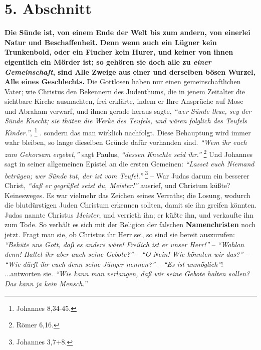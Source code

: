 \section{5. Abschnitt} \label{kap1_ab5}

\textbf{Die Sünde
ist, von einem Ende der Welt bis zum andern, von einerlei Natur und
Beschaffenheit. Denn wenn auch ein Lügner kein Trunkenbold, oder ein Flucher
kein Hurer, und keiner von ihnen eigentlich ein Mörder ist; so gehören sie doch
alle zu \textit{einer Gemeinschaft}, sind Alle Zweige aus einer und derselben
bösen Wurzel, Alle eines Geschlechts.} Die Gottlosen haben nur einen
gemeinschaftlichen Vater; wie Christus den Bekennern des Judenthums, die in
jenem Zeitalter die sichtbare Kirche ausmachten, frei erklärte, indem er Ihre
Ansprüche auf Mose und Abraham  
verwarf, und ihnen gerade heraus sagte,
\textit{"`wer Sünde thue, sey der Sünde Knecht; sie thäten die Werke des Teufels,
und wären folglich des Teufels Kinder."'},
\footnote{Johannes 8,34-45.}
.
sondern das man wirklich nachfolgt. Diese Behauptung wird immer wahr bleiben,
so lange dieselben Gründe dafür vorhanden sind.
\textit{"`Wem ihr euch zum Gehorsam ergebet,"'} sagt Paulus, \textit{"`dessen
Knechte seid ihr."'}
\footnote{Römer 6,16.}
Und Johannes sagt in seiner allgemeinen Epistel an die ersten Gemeinen:
\textit{"`Lasset euch Niemand betrügen; wer Sünde tut, der ist vom Teufel."'}
\footnote{Johannes 3,7+8.}
-- War Judas  darum ein besserer Christ,
\textit{"`daß er gegrüßet seist du, Meister!"'} ausrief, und Christum küßte?
Keinesweges. Es war vielmehr das Zeichen seines Verraths;
die Losung, wodurch die blutdürstigen Juden Christum erkennen sollten, damit sie
ihn greifen könnten. Judas nannte Christus \textit{Meister}, und verrieth ihn;
er küßte ihn, und verkaufte ihn zum Tode.
So verhält es sich mit der Religion der falschen \textbf{Namenchristen}
 noch jetzt.
Fragt man sie, ob Christus ihr Herr sei,
so sind sie bereit auszurufen:
\textit{"`Behüte uns Gott, daß es anders wäre! Freilich ist er unser Herr!"'}
-- \textit{"`Wohlan denn! Haltet ihr aber auch seine Gebote?"'}
-- \textit{"`O Nein! Wie könnten wir das?"'}
-- \textit{"`Wie dürft ihr euch denn seine Jünger nennen?"'}
-- \textit{"`Es ist unmöglich"'}!
...antworten sie.
\textit{"`Wie kann man verlangen, daß wir seine Gebote halten sollen? Das kann
ja kein Mensch."'}
